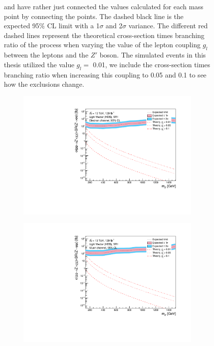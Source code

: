 \documentclass[12pt, a4paper]{book}
\begin{document}
\begin{figure}[!ht]
{   and have rather just connected the values calculated for each mass point by connecting the points. The dashed black line is the expected 95\% CL limit with a 1$\sigma$ and 2$\sigma$ variance. 
   The different red dashed lines represent the theoretical cross-section times branching ratio of the process when varying the value of the lepton coupling $g_l$ between the leptons and the $Z'$ boson. The simulated events in this thesis utilized the value $g_l=$ 0.01, we include the cross-section times branching ratio when increasing this coupling to 0.05 and 0.1 to see how the exclusions change.  }\label{fig:LV_HDS_exclusion_ee_uu}
\end{figure}

\begin{figure}[!ht]
	\centering
	\begin{subfigure}[b]{0.49\textwidth}
      \centering
      \includegraphics[width=1\textwidth]{Limits/Model_independent/50-100/LV_HDS/mass_exclusion_ee.pdf}
   \end{subfigure}
   \hfill
   \begin{subfigure}[b]{0.49\textwidth}
      \centering
      \includegraphics[width=1\textwidth]{Limits/Model_independent/50-100/LV_HDS/mass_exclusion_uu.pdf}

\end{subfigure}
\end{figure}
\end{document}

